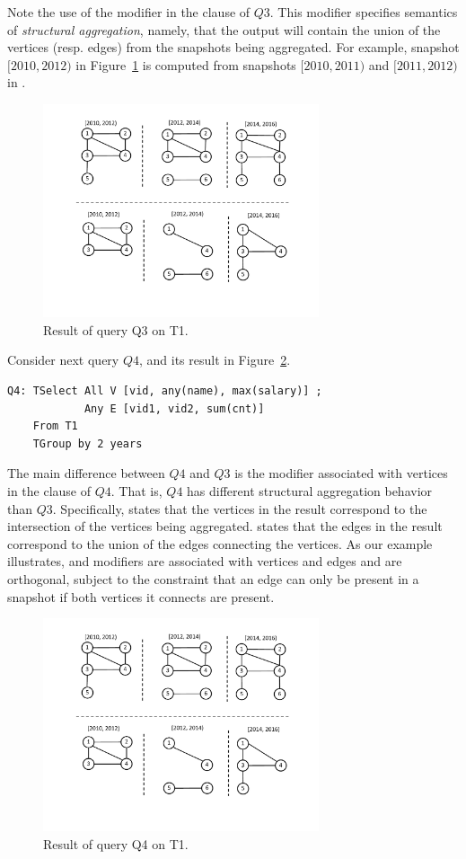 Note the use of the modifier  in the  clause
of $Q3$.  This modifier specifies semantics of {\em structural
  aggregation}, namely, that the output will contain the union of the
vertices (resp. edges) from the snapshots being aggregated.  For
example, snapshot $[2010, 2012)$ in Figure~\ref{fig:q3} is computed
  from snapshots $[2010, 2011)$ and $[2011, 2012)$ in .

\begin{figure}
\includegraphics[width=3.2in]{figs/TGroupAny.pdf}
\caption{Result of query Q3 on T1.}
\label{fig:q3}
\end{figure}

Consider next query $Q4$, and its result in
Figure~\ref{fig:tg_all_any}.

\begin{verbatim}
Q4: TSelect All V [vid, any(name), max(salary)] ; 
            Any E [vid1, vid2, sum(cnt)] 
    From T1 
    TGroup by 2 years
\end{verbatim}

The main difference between $Q4$ and $Q3$ is the  modifier
associated with vertices in the  clause of $Q4$.  That
is, $Q4$ has different structural aggregation behavior than $Q3$.
Specifically,  states that the vertices in the result
correspond to the intersection of the vertices being aggregated.
 states that the edges in the result correspond to the
union of the edges connecting the vertices.  As our example
illustrates,  and  modifiers are associated with
vertices and edges and are orthogonal, subject to the constraint that
an edge can only be present in a snapshot if both vertices it connects
are present.

\begin{figure}
\includegraphics[width=3.2in]{figs/TGroupAllAny.pdf}
\caption{Result of query Q4 on T1.}
\label{fig:tg_all_any}
\end{figure}

